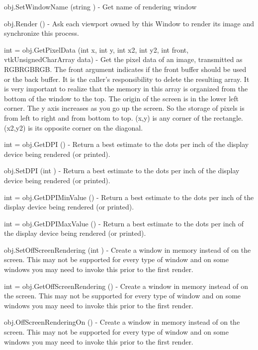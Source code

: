 \begin{DoxyItemize}
\item {\ttfamily obj.\-Set\-Window\-Name (string )} -\/ Get name of rendering window  
\item {\ttfamily obj.\-Render ()} -\/ Ask each viewport owned by this Window to render its image and synchronize this process.  
\item {\ttfamily int = obj.\-Get\-Pixel\-Data (int x, int y, int x2, int y2, int front, vtk\-Unsigned\-Char\-Array data)} -\/ Get the pixel data of an image, transmitted as R\-G\-B\-R\-G\-B\-R\-G\-B. The front argument indicates if the front buffer should be used or the back buffer. It is the caller's responsibility to delete the resulting array. It is very important to realize that the memory in this array is organized from the bottom of the window to the top. The origin of the screen is in the lower left corner. The y axis increases as you go up the screen. So the storage of pixels is from left to right and from bottom to top. (x,y) is any corner of the rectangle. (x2,y2) is its opposite corner on the diagonal.  
\item {\ttfamily int = obj.\-Get\-D\-P\-I ()} -\/ Return a best estimate to the dots per inch of the display device being rendered (or printed).  
\item {\ttfamily obj.\-Set\-D\-P\-I (int )} -\/ Return a best estimate to the dots per inch of the display device being rendered (or printed).  
\item {\ttfamily int = obj.\-Get\-D\-P\-I\-Min\-Value ()} -\/ Return a best estimate to the dots per inch of the display device being rendered (or printed).  
\item {\ttfamily int = obj.\-Get\-D\-P\-I\-Max\-Value ()} -\/ Return a best estimate to the dots per inch of the display device being rendered (or printed).  
\item {\ttfamily obj.\-Set\-Off\-Screen\-Rendering (int )} -\/ Create a window in memory instead of on the screen. This may not be supported for every type of window and on some windows you may need to invoke this prior to the first render.  
\item {\ttfamily int = obj.\-Get\-Off\-Screen\-Rendering ()} -\/ Create a window in memory instead of on the screen. This may not be supported for every type of window and on some windows you may need to invoke this prior to the first render.  
\item {\ttfamily obj.\-Off\-Screen\-Rendering\-On ()} -\/ Create a window in memory instead of on the screen. This may not be supported for every type of window and on some windows you may need to invoke this prior to the first render.  

\end{DoxyItemize}
